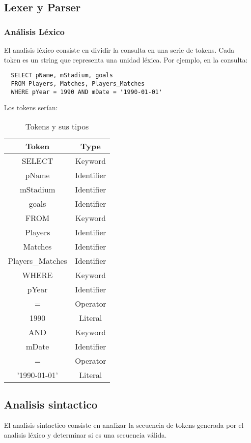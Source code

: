 \subsection{Lexer y Parser}
\subsubsection{Análisis Léxico}
El analisis léxico consiste en dividir la consulta en una serie de tokens. Cada token es un string que representa una unidad léxica. Por ejemplo, en la consulta:
\begin{verbatim}
  SELECT pName, mStadium, goals
  FROM Players, Matches, Players_Matches
  WHERE pYear = 1990 AND mDate = '1990-01-01'
\end{verbatim}

Los tokens serían:
\begin{table}[h!]
  \centering
  \begin{tabular}{|c|c|}
    \hline
    \textbf{Token} & \textbf{Type} \\ \hline
    SELECT & Keyword \\ \hline
    pName & Identifier \\ \hline
    mStadium & Identifier \\ \hline
    goals & Identifier \\ \hline
    FROM & Keyword \\ \hline
    Players & Identifier \\ \hline
    Matches & Identifier \\ \hline
    Players\_Matches & Identifier \\ \hline
    WHERE & Keyword \\ \hline
    pYear & Identifier \\ \hline
    = & Operator \\ \hline
    1990 & Literal \\ \hline
    AND & Keyword \\ \hline
    mDate & Identifier \\ \hline
    = & Operator \\ \hline
    '1990-01-01' & Literal \\ \hline
  \end{tabular}
  \caption{Tokens y sus tipos}
  \vspace{-1em} 
\end{table}

\subsection{Analisis sintactico}
El analisis sintactico consiste en analizar la secuencia de tokens generada por el analisis léxico y determinar si es una secuencia válida.

